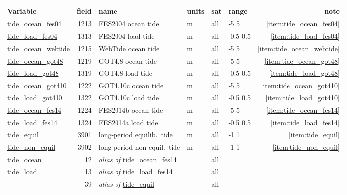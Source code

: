 \documentclass[a4paper,11pt,openany,natbib,nomargin]{thesis}
\makeatletter
\newcommand\var[1]{\url{#1}\index{variables!#1@\protect\url{#1}}}
\newcommand\alias[1]{\emph{alias of} \var{#1}}
\newenvironment{vartable}{
\begin{table}[ht]
\small
\begin{tabular}{lrllllr}
\hline
Variable & field & name & units & sat & range & note \\
\hline
}{
\hline
\end{tabular}
\end{table}
}
\makeatother
\begin{document}
\begin{vartable}
\var{tide_ocean_fes04} & 1213 & FES2004  ocean tide & m & all & -5 5 & \ref{item:tide_ocean_fes04} \\
\var{tide_load_fes04}  & 1313 & FES2004  load  tide & m & all & -0.5 0.5 & \ref{item:tide_load_fes04} \\
\var{tide_ocean_webtide}&1215 & WebTide  ocean tide & m & all & -5 5 & \ref{item:tide_ocean_webtide} \\
\var{tide_ocean_got48} & 1219 & GOT4.8   ocean tide & m & all & -5 5 & \ref{item:tide_ocean_got48} \\
\var{tide_load_got48}  & 1319 & GOT4.8   load  tide & m & all & -0.5 0.5 & \ref{item:tide_load_got48} \\
\var{tide_ocean_got410}& 1222 & GOT4.10c ocean tide & m & all & -5 5 & \ref{item:tide_ocean_got410} \\
\var{tide_load_got410} & 1322 & GOT4.10c load  tide & m & all & -0.5 0.5 & \ref{item:tide_load_got410} \\
\var{tide_ocean_fes14} & 1224 & FES2014b ocean tide & m & all & -5 5 & \ref{item:tide_ocean_fes14} \\
\var{tide_load_fes14}  & 1324 & FES2014a load  tide & m & all & -0.5 0.5 & \ref{item:tide_load_fes14} \\
\var{tide_equil}       & 3901 & long-period equilib.\ tide & m & all & -1 1 & \ref{item:tide_equil} \\
\var{tide_non_equil}   & 3902 & long-period non-equil.\ tide & m & all & -1 1 & \ref{item:tide_non_equil} \\
\hline
\var{tide_ocean} & 12 & \alias{tide_ocean_fes14} && all && \\
\var{tide_load}  & 13 & \alias{tide_load_fes14} && all && \\
                 & 39 & \alias{tide_equil} && all && \\
\end{vartable}
\end{document}
